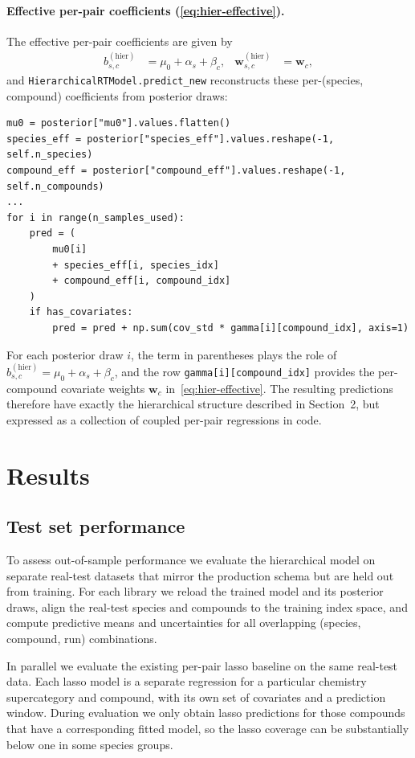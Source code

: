 \documentclass[11pt]{article}
\begin{document}
\paragraph{Effective per-pair coefficients \texorpdfstring{(\eqref{eq:hier-effective})}{(2.4)}.}
The effective per-pair coefficients are given by
\begin{align*}
  b^{(\mathrm{hier})}_{s,c}
  &=
  \mu_0+\alpha_s+\beta_c,
  &
  \bm{w}^{(\mathrm{hier})}_{s,c}
  &=
  \bm{w}_c,
\end{align*}
and \texttt{HierarchicalRTModel.predict\_new} reconstructs these per-(species, compound)
coefficients from posterior draws:
\begin{verbatim}
mu0 = posterior["mu0"].values.flatten()
species_eff = posterior["species_eff"].values.reshape(-1, self.n_species)
compound_eff = posterior["compound_eff"].values.reshape(-1, self.n_compounds)
...
for i in range(n_samples_used):
    pred = (
        mu0[i]
        + species_eff[i, species_idx]
        + compound_eff[i, compound_idx]
    )
    if has_covariates:
        pred = pred + np.sum(cov_std * gamma[i][compound_idx], axis=1)
\end{verbatim}
For each posterior draw $i$, the term in parentheses plays the role of
$b^{(\mathrm{hier})}_{s,c}=\mu_0+\alpha_s+\beta_c$, and the row
\texttt{gamma[i][compound\_idx]} provides the per-compound covariate weights
$\bm{w}_c$ in~\eqref{eq:hier-effective}. The resulting predictions therefore have
exactly the hierarchical structure described in Section~2, but expressed as a
collection of coupled per-pair regressions in code.

\section{Results}

\subsection{Test set performance}

To assess out-of-sample performance we evaluate the hierarchical model on separate
real-test datasets that mirror the production schema but are held out from training.
For each library we reload the trained model and its posterior draws, align the
real-test species and compounds to the training index space, and compute predictive
means and uncertainties for all overlapping (species, compound, run) combinations.

In parallel we evaluate the existing per-pair lasso baseline on the same real-test
data. Each lasso model is a separate regression for a particular chemistry
supercategory and compound, with its own set of covariates and a prediction window.
During evaluation we only obtain lasso predictions for those compounds that have a
corresponding fitted model, so the lasso coverage can be substantially below one in
some species groups.
\end{document}
